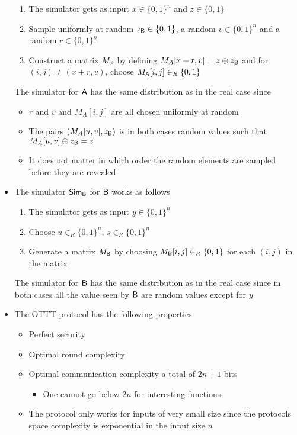\begin{itemize}
\begin{enumerate}
        \item The simulator gets as input $x \in \{0,1\}^n$ and $z \in \{0,1\}$
        \item Sample uniformly at random $z_{\mathsf{B}} \in \{0,1\}$, a random $v \in \{0,1\}^n$ and a random $r \in \{0,1\}^n$
        \item Construct a matrix $M_A$ by defining $M_A[x+r, v] = z \oplus z_{\mathsf{B}}$ and for $(i,j) \neq (x+r, v)$, choose $M_{\mathsf{A}}[i,j] \in_R \{0,1\}$ 
    \end{enumerate}
    The simulator for $\mathsf{A}$ has the same distribution as in the real case since
    \begin{itemize}
        \item $r$ and $v$ and $M_A[i,j]$ are all chosen uniformly at random
        \item The pairs $(M_A[u,v], z_{\mathsf{B}})$ is in both cases random values such that $M_A[u,v] \oplus z_{\mathsf{B}} = z$
        \item It does not matter in which order the random elements are sampled before they are revealed
    \end{itemize}
    \item The simulator $\mathsf{Sim}_{\mathsf{B}}$ for $\mathsf{B}$ works as follows
    \begin{enumerate}
        \item The simulator gets as input $y \in \{0,1\}^n$ 
        \item Choose $u \in_R \{0,1\}^n$, $s \in_R \{0,1\}^n$
        \item Generate a matrix $M_{\mathsf{B}}$ by choosing $M_{\mathsf{B}}[i,j] \in_R \{0,1\}$ for each $(i,j)$ in the matrix
    \end{enumerate}
    The simulator for $\mathsf{B}$ has the same distribution as in the real case since in both cases all the value seen by $\mathsf{B}$ are random values except for $y$
    \item The OTTT protocol has the following properties:
    \begin{itemize}
        \item[\checkmark] Perfect security
        \item[\checkmark] Optimal round complexity
        \item[\checkmark] Optimal communication complexity a total of $2n+1$ bits
        \begin{itemize}
            \item One cannot go below $2n$ for interesting functions 
        \end{itemize}
        \item[\cross]The protocol only works for inputs of very small size since the protocols space complexity is exponential in the input size $n$
    \end{itemize}
\end{itemize}


